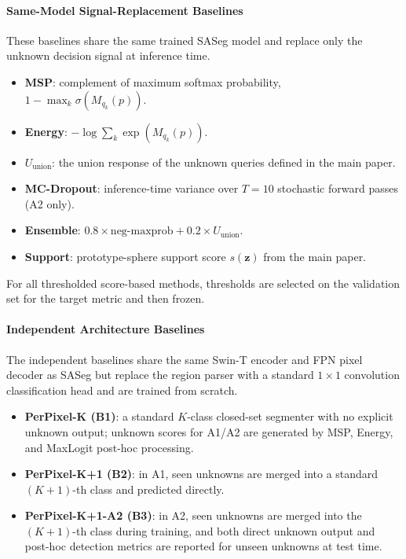 \documentclass[11pt]{article}
\newcommand{\bz}{\mathbf{z}}
\begin{document}
\paragraph{Same-Model Signal-Replacement Baselines}
These baselines share the same trained SASeg model and replace only the unknown
decision signal at inference time.
\begin{itemize}[nosep]
  \item \textbf{MSP}: complement of maximum softmax probability,
        $1 - \max_k \sigma(M_{q_k}(p))$.
  \item \textbf{Energy}: $-\log \sum_k \exp(M_{q_k}(p))$.
  \item \textbf{$U_{\text{union}}$}: the union response of the unknown queries defined
        in the main paper.
  \item \textbf{MC-Dropout}: inference-time variance over $T=10$ stochastic forward
        passes (A2 only).
  \item \textbf{Ensemble}: $0.8 \times \text{neg-maxprob} + 0.2 \times U_{\text{union}}$.
  \item \textbf{Support}: prototype-sphere support score $s(\bz)$ from the main paper.
\end{itemize}
For all thresholded score-based methods, thresholds are selected on the validation set
for the target metric and then frozen.

\paragraph{Independent Architecture Baselines}
The independent baselines share the same Swin-T encoder and FPN pixel decoder as SASeg
but replace the region parser with a standard $1 \times 1$ convolution classification
head and are trained from scratch.
\begin{itemize}[nosep]
  \item \textbf{PerPixel-K (B1)}: a standard $K$-class closed-set segmenter with no
        explicit unknown output; unknown scores for A1/A2 are generated by MSP, Energy,
        and MaxLogit post-hoc processing.
  \item \textbf{PerPixel-K+1 (B2)}: in A1, seen unknowns are merged into a standard
        $(K+1)$-th class and predicted directly.
  \item \textbf{PerPixel-K+1-A2 (B3)}: in A2, seen unknowns are merged into the
        $(K+1)$-th class during training, and both direct unknown output and post-hoc
        detection metrics are reported for unseen unknowns at test time.
\end{itemize}
\end{document}
